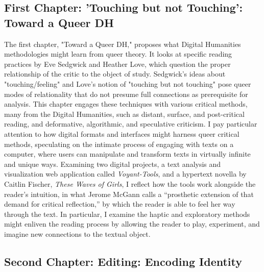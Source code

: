 \documentclass[11pt]{article}
\begin{document}
\subsection{First Chapter: 'Touching but not Touching': Toward a Queer DH}
\label{sec:org624a65d}

The first chapter, "Toward a Queer DH," proposes what Digital
Humanities methodologies might learn from queer theory. It looks at
specific reading practices by Eve Sedgwick and Heather Love, which
question the proper relationship of the critic to the object of
study. Sedgwick's ideas about "touching/feeling" and Love's notion of
"touching but not touching" pose queer modes of relationality that do
not presume full connections as prerequisite for analysis. This
chapter engages these techniques with various critical methods, many
from the Digital Humanities, such as distant, surface, and
post-critical reading, and deformative, algorithmic, and speculative
criticism. I pay particular attention to how digital formats and
interfaces might harness queer critical methods, speculating on the
intimate process of engaging with texts on a computer, where users can
manipulate and transform texts in virtually infinite and unique
ways. Examining two digital projects, a text analysis and
visualization web application called \emph{Voyant-Tools}, and a hypertext
novella by Caitlin Fischer, \emph{These Waves of Girls}, I reflect how the
tools work alongside the reader’s intuition, in what Jerome McGann
calls a “prosthetic extension of that demand for critical reflection,”
by which the reader is able to feel her way through the text. In
particular, I examine the haptic and exploratory methods might enliven
the reading process by allowing the reader to play, experiment, and
imagine new connections to the textual object.

\subsection{Second Chapter: Editing: Encoding Identity}
\label{sec:org6449bfa}
\end{document}
